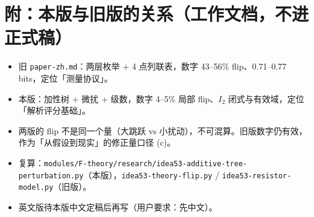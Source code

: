 \documentclass[12pt]{ctexart}
\begin{document}
\section*{附：本版与旧版的关系（工作文档，不进正式稿）}
\begin{itemize}
  \item 旧 \texttt{paper-zh.md}：两层枚举 + 4 点列联表，数字 43--56\% flip、0.71--0.77 bits，定位「测量协议」。
  \item 本版：加性树 + 微扰 + 级数，数字 4--5\% 局部 flip、$I_2$ 闭式与有效域，定位「解析评分基础」。
  \item 两版的 flip 不是同一个量（大跳跃 vs 小扰动），不可混算。旧版数字仍有效，作为「从假设到现实」的修正量口径 (c)。
  \item 复算：\texttt{modules/F-theory/research/idea53-additive-tree-perturbation.py}（本版），\texttt{idea53-theory-flip.py} / \texttt{idea53-resistor-model.py}（旧版）。
  \item 英文版待本版中文定稿后再写（用户要求：先中文）。
\end{itemize}
\end{document}

